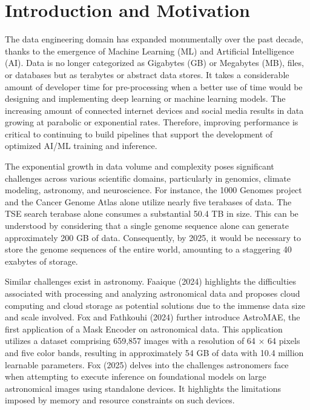 \section{Introduction and Motivation}\label{sec:intro}
The data engineering domain has expanded monumentally over the past decade, thanks to the emergence of Machine Learning (ML) and Artificial Intelligence (AI). Data is no longer categorized as Gigabytes (GB) or Megabytes (MB), files, or databases but as terabytes or abstract data stores. It takes a considerable amount of developer time for pre-processing when a better use of time would be designing and implementing deep learning or machine learning models. The increasing amount of connected internet devices and social media results in data growing at parabolic or exponential rates.  Therefore, improving performance is critical to continuing to build pipelines that support the development of optimized AI/ML training and inference.

The exponential growth in data volume and complexity poses significant challenges across various scientific domains, particularly in genomics, climate modeling, astronomy, and neuroscience. For instance, the 1000 Genomes project and the Cancer Genome Atlas alone utilize nearly five terabases of data\cite{McKenna2010The}. The TSE search terabase alone consumes a substantial 50.4 TB in size. This can be understood by considering that a single genome sequence alone can generate approximately 200 GB of data\cite{genomefaq:online}. Consequently, by 2025, it would be necessary to store the genome sequences of the entire world, amounting to a staggering 40 exabytes of storage.

Similar challenges exist in astronomy. Faaique (2024) highlights the difficulties associated with processing and analyzing astronomical data and proposes cloud computing and cloud storage as potential solutions\cite{faaique} due to the immense data size and scale involved. Fox and Fathkouhi (2024) further introduce AstroMAE, the first application of a Mask Encoder on astronomical data\cite{Fathkouhi2024}. This application utilizes a dataset comprising 659,857 images with a resolution of 64 × 64 pixels and five color bands, resulting in approximately 54 GB of data with 10.4 million learnable parameters.  Fox (2025) delves into the challenges astronomers face when attempting to execute inference on foundational models on large astronomical images using standalone devices. It highlights the limitations imposed by memory and resource constraints on such devices\cite{Staylor2024cosmic}.

